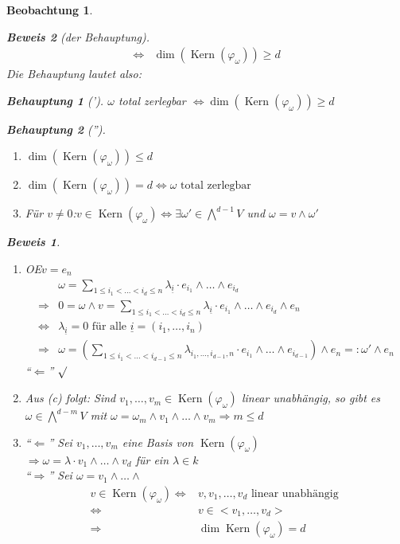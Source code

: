 \documentclass[a4paper,12pt]{report}
\theoremstyle{break}
\theoremstyle{nonumberbreak}
\newtheorem{Beo}{Beobachtung}
\newtheorem{Beh}{Behauptung}
\theoremstyle{nonumberplain}
\newtheorem{Bew}{Beweis}
\newcommand{\defeql}[0]{=\mathrel{\mathop:}}
\DeclareMathOperator{\Kern}{Kern}
\renewcommand{\OE}{O\!\!E}
\begin{document}
\begin{Beo}
\begin{Bew}[der Behauptung]
\begin{align*}
      \Leftrightarrow & \dim(\Kern(\varphi_\omega))\geq d
    \end{align*}
    Die Behauptung lautet also:
    \begin{Beh}[']
      $\omega$ total zerlegbar $\Leftrightarrow \dim(\Kern(\varphi_\omega))\geq d$
    \end{Beh}
    \begin{Beh}['']
      \begin{enumerate}
      \item $\dim(\Kern(\varphi_\omega))\leq d$
      \item $\dim(\Kern(\varphi_\omega))=d\Leftrightarrow \omega\text{ total zerlegbar }$
      \item Für $v\neq0$:$v\in\Kern(\varphi_\omega)\Leftrightarrow\exists\omega'\in\bigwedge^{d-1}V$ und $\omega=v\wedge\omega'$
      \end{enumerate}
    \end{Beh}
    \begin{Bew}
      \begin{enumerate}
      \item[(c)] \OE $v=e_n$
        \begin{align*}
          & \omega=\sum_{1\leq i_1 <\dots < i_d\leq n}\lambda_{\underline{i}}\cdot e_{i_1}\wedge\dots\wedge e_{i_d} \\
          \Rightarrow & 0=\omega\wedge v=\sum_{1\leq i_1 <\dots < i_d\leq n}\lambda_{\underline{i}}\cdot e_{i_1}\wedge\dots\wedge e_{i_d}\wedge e_n \\
          \Leftrightarrow & \lambda_{\underline{i}}=0\text{ für alle } \underline{i}=(i_1,\dots,i_n) \\
          \Rightarrow & \omega = \left(\sum_{1\leq i_1 <\dots < i_{d-1}\leq n}\lambda_{i_1,\dots,i_{d-1},n}\cdot e_{i_1}\wedge\dots\wedge e_{i_{d-1}}\right)
          \wedge e_n\defeql\omega'\wedge e_n
        \end{align*}
        ``$\Leftarrow$'' $\surd$
      \item[(a)] Aus (c) folgt: Sind $v_1,\dots,v_m\in\Kern(\varphi_\omega)$ linear unabhängig, so gibt es $\omega\in\bigwedge^{d-m}V$ mit
        $\omega=\omega_m\wedge v_1\wedge\dots\wedge v_m \Rightarrow m \leq d$
      \item[(b)] ``$\Leftarrow$'' Sei $v_1,\dots,v_m$ eine Basis von $\Kern(\varphi_\omega)$ \\
        $\Rightarrow\omega=\lambda\cdot v_1\wedge\dots\wedge v_d$ für ein $\lambda\in k$ \\
        ``$\Rightarrow$'' Sei $\omega=v_1\wedge\dots\wedge$
        \begin{align*}
          v\in\Kern(\varphi_\omega) \Leftrightarrow & v,v_1,\dots,v_d\text{ linear unabhängig } \\
          \Leftrightarrow & v\in<v_1,\dots,v_d> \\
          \Rightarrow & \dim\Kern(\varphi_\omega)=d
        \end{align*}
      \end{enumerate}
    \end{Bew}
  \end{Bew}
\end{Beo}
\end{document}
